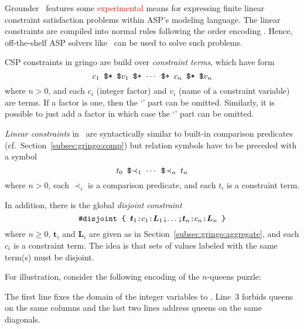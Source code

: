 Grounder \gringo\ features some \textcolor{red}{experimental} means for expressing finite linear constraint satisfaction problems within ASP's modeling language.
The linear constraints are compiled into normal rules following the order encoding \cite{tatakiba09a,bageinscsotawe13a}.
Hence, off-the-shelf ASP solvers like \clasp\ can be used to solve such problems.

CSP constraints in gringo are build over \emph{constraint terms}, which have form
\[\texttt{$c_1$~\$*~\$$v_1$~\$+~$\cdots$~\$+~$c_n$~\$*~\$$v_n$}\]
where $n>0$, and each $c_i$ (integer factor) and $v_i$ (name of a constraint variable) are terms.
If a factor is one, then the `' part can be omitted.
Similarly, it is possible to just add a factor in which case the `' part can be omitted.

\emph{Linear constraints} in \gringo\ are syntactically similar to built-in comparison predicates (cf.\ Section~\ref{subsec:gringo:comp})
but relation symbols have to be preceded with a \code{\$} symbol
\[\texttt{$t_0$~\$$\prec_1$~$\cdots$~\$$\prec_{n}$~$t_n$}\]
where $n>0$, each $\prec_i$ is a comparison predicate, and each $t_i$ is a constraint term.

In addition, there is the global \emph{disjoint constraint}
\[\texttt{\#disjoint~\{~$\boldsymbol{t}_1$:$c_1$:$\boldsymbol{L}_1$;$\dots$;$\boldsymbol{t}_n$:$c_n$:$\boldsymbol{L}_n$~\}}\]
where $n\geq 0$, $\boldsymbol{t}_i$ and $\boldsymbol{L}_i$ are given as in Section~\ref{subsec:gringo:aggregate},
and each $c_i$ is a constraint term.
%
The idea is that sets of values labeled with the same term(s) must be disjoint.

\begin{example}\label{ex:csp:queens1}
For illustration,
consider the following encoding of the $n$-queens puzzle:


The first line fixes the domain of the integer variables
 to .
Line~3 forbids queens on the same columns and the last two lines address queens on the same diagonals.
\end{example}

